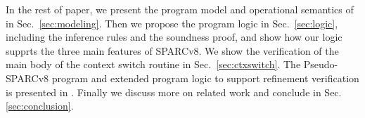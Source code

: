 In the rest of paper,
we present the program model
and operational semantics of \sparc{} in Sec.~\ref{sec:modeling}.
Then we propose the program logic in Sec.~\ref{sec:logic},
including the inference rules and the soundness proof, 
and show how our logic supprts the three main features of SPARCv8.
We show the verification of the main body of the context switch routine
in Sec.~\ref{sec:ctxswitch}. 
The Pseudo-SPARCv8 program and extended 
program logic to support refinement verification is 
presented in \Sec{\ref{sec:refine-verification-sparc}}. 
Finally we discuss more on
related work and conclude in Sec. \ref{sec:conclusion}.
